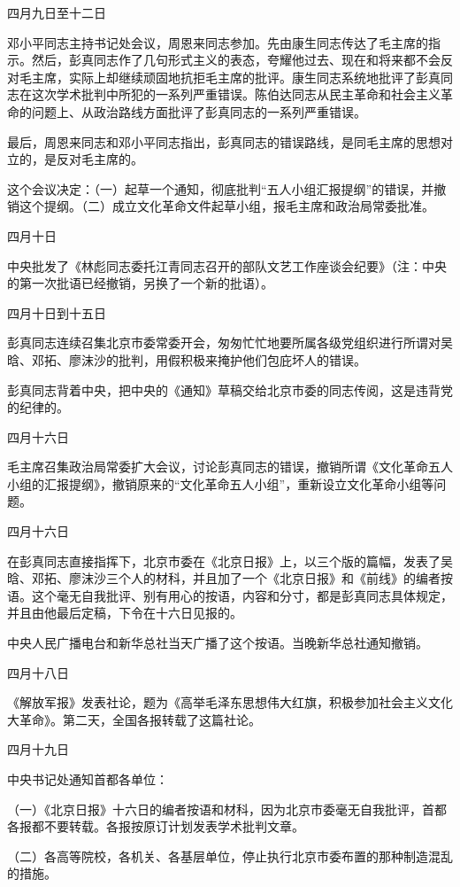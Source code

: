 \begin{maonote}
四月九日至十二日

邓小平同志主持书记处会议，周恩来同志参加。先由康生同志传达了毛主席的指示。然后，彭真同志作了几句形式主义的表态，夸耀他过去、现在和将来都不会反对毛主席，实际上却继续顽固地抗拒毛主席的批评。康生同志系统地批评了彭真同志在这次学术批判中所犯的一系列严重错误。陈伯达同志从民主革命和社会主义革命的问题上、从政治路线方面批评了彭真同志的一系列严重错误。

最后，周恩来同志和邓小平同志指出，彭真同志的错误路线，是同毛主席的思想对立的，是反对毛主席的。

这个会议决定：（一）起草一个通知，彻底批判“五人小组汇报提纲”的错误，并撤销这个提纲。（二）成立文化革命文件起草小组，报毛主席和政治局常委批准。

四月十日

中央批发了《林彪同志委托江青同志召开的部队文艺工作座谈会纪要》（注：中央的第一次批语已经撤销，另换了一个新的批语）。

四月十日到十五日

彭真同志连续召集北京市委常委开会，匆匆忙忙地要所属各级党组织进行所谓对吴晗、邓拓、廖沫沙的批判，用假积极来掩护他们包庇坏人的错误。

彭真同志背着中央，把中央的《通知》草稿交给北京市委的同志传阅，这是违背党的纪律的。

四月十六日

毛主席召集政治局常委扩大会议，讨论彭真同志的错误，撤销所谓《文化革命五人小组的汇报提纲》，撤销原来的“文化革命五人小组”，重新设立文化革命小组等问题。

四月十六日

在彭真同志直接指挥下，北京市委在《北京日报》上，以三个版的篇幅，发表了吴晗、邓拓、廖沫沙三个人的材科，并且加了一个《北京日报》和《前线》的编者按语。这个毫无自我批评、别有用心的按语，内容和分寸，都是彭真同志具体规定，并且由他最后定稿，下令在十六日见报的。

中央人民广播电台和新华总社当天广播了这个按语。当晚新华总社通知撤销。

四月十八日

《解放军报》发表社论，题为《高举毛泽东思想伟大红旗，积极参加社会主义文化大革命》。第二天，全国各报转载了这篇社论。

四月十九日

中央书记处通知首都各单位：

（一）《北京日报》十六日的编者按语和材科，因为北京市委毫无自我批评，首都各报都不要转载。各报按原订计划发表学术批判文章。

（二）各高等院校，各机关、各基层单位，停止执行北京市委布置的那种制造混乱的措施。


\end{maonote}

